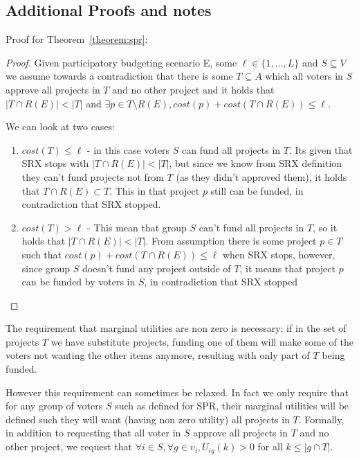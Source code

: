 \documentclass[runningheads]{llncs}
\begin{document}
\clearpage
\begin{subappendices}
\section{Additional Proofs and notes}\label{app:proofs}

Proof for Theorem~\ref{theorem:spr}:
\begin{proof}
Given participatory budgeting scenario E, some $\ell\in \{1,\ldots,L\}$ and $S\subseteq V$  we  assume towards a contradiction that there is some $T\subseteq A$ which all voters in $S$ approve all projects in $T$ and no other project and it holds that $|T\cap R(E)|<|T|$ and $\exists p\in T\setminus R(E), cost(p) +cost(T\cap R(E))\leq \ell$.


We can look at two cases:
\begin{enumerate}
    \item $cost(T)\leq\ell$ - in this case voters $S$ can fund all projects in $T$. Its given that SRX stops with $|T\cap R(E)|<|T|$, but since we know from SRX definition they can't fund projects not from $T$ (as they didn't approved them), it holds that $T\cap R(E)\subset T$. This in that project $p$ still can be funded, in contradiction that SRX stopped.
    
    \item $cost(T)>\ell$ - This mean that group $S$ can't fund all projects in $T$, so it holds that $|T\cap R(E)|<|T|$. From assumption there is some project $p\in T$ such that $cost(p) +cost(T\cap R(E))\leq \ell$ when SRX stops, however, since group $S$ doesn't fund any project outside of $T$, it means that project $p$ can be funded by voters in $S$, in contradiction that SRX stopped
\end{enumerate}
\end{proof}

The requirement that  marginal utilities are non zero is necessary: if in the set of projects $T$ we have substitute projects, funding one of them will make some of the voters not wanting the other items anymore, resulting with only part of $T$ being funded.

However this requirement can sometimes be relaxed. In fact we only require that for any group of voters $S$ such as defined for SPR, their marginal utilities will be defined such they will want (having non zero utility) all projects in $T$. Formally, in addition to requesting that all voter in $S$ approve all projects in $T$ and no other project, we request that $\forall i\in S, \forall g\in v_i, U_{ig}(k)>0 $ for all $k\leq |g\cap T|$.


\end{subappendices}
\end{document}
